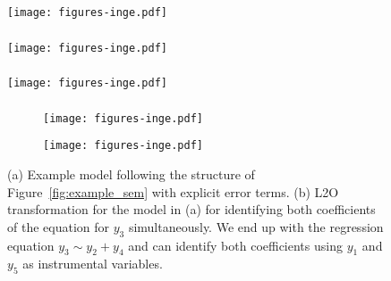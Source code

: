 \documentclass{beamer}
\begin{document}
\begin{frame}
	\frametitle{}
	\begin{figure}
		\centering
		\texttt{[image: figures-inge.pdf]}
		\caption{}
		\label{fig:l2o_parent}
	\end{figure}
\end{frame}
\begin{frame}
	\frametitle{}
	\begin{figure}
		\centering
		\texttt{[image: figures-inge.pdf]}
		\caption{}
		\label{fig:l2o_child}
	\end{figure}
\end{frame}
\begin{frame}
	\frametitle{}
	\begin{figure}
		\centering
		\texttt{[image: figures-inge.pdf]}
		\caption{}
		\label{fig:l2o_both}
	\end{figure}
\end{frame}

\begin{frame}
	\frametitle{}
		\begin{figure}[t]
			\begin{subfigure}[b]{0.5 \linewidth}
				\centering
				\texttt{[image: figures-inge.pdf]}
				\caption{}
				\label{fig:transform_example}
			\end{subfigure}%
			\begin{subfigure}[b]{0.5 \linewidth}
				\centering
				\texttt{[image: figures-inge.pdf]}
				\caption{}
				\label{fig:transform_example_single}
			\end{subfigure}
		\caption{(a) Example model following the structure of
			Figure~\ref{fig:example_sem} with explicit error terms. 
			(b) L2O transformation for the model in (a) for identifying both
			coefficients of the equation for $y_3$ simultaneously. We end up with
			the regression equation $y_3 \sim y_2 + y_4$ and can identify both
			coefficients using $y_1$ and $y_5$ as instrumental variables.}
		\label{fig:examples1}
		\end{figure}
\end{frame}
\end{document}
